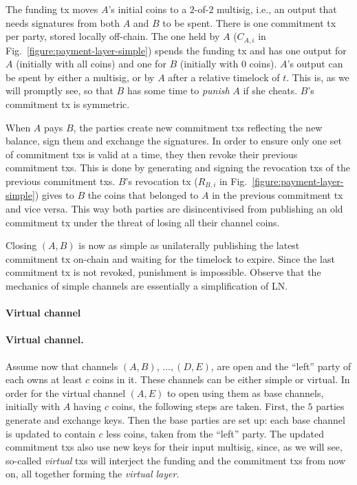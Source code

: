   The funding tx moves $A$'s initial coins to a $2$-of-$2$ multisig, i.e., an
  output that needs signatures from both $A$ and $B$ to be spent. There is one
  commitment tx per party, stored locally off-chain. The one held by $A$
  ($C_{A,i}$ in Fig.~\ref{figure:payment-layer-simple}) spends the funding tx
  and has one output for $A$ (initially with all coins) and one for $B$
  (initially with $0$ coins). $A$'s output can be spent by either a multisig, or
  by $A$ after a relative timelock of $t$. This is, as we will promptly see, so
  that $B$ has some time to \emph{punish} $A$ if she cheats. $B$'s commitment tx
  is symmetric.

  When $A$ pays $B$, the parties create new commitment txs reflecting the new
  balance, sign them and exchange the signatures. In order to ensure only one
  set of commitment txs is valid at a time, they then revoke their previous
  commitment txs. This is done by generating and signing the revocation txs of
  the previous commitment txs. $B$'s revocation tx ($R_{B,i}$ in
  Fig.~\ref{figure:payment-layer-simple}) gives to $B$ the coins that belonged
  to $A$ in the previous commitment tx and vice versa. This way both parties are
  disincentivised from publishing an old commitment tx under the threat of
  losing all their channel coins.

  Closing $(A, B)$ is now as simple as unilaterally publishing the latest
  commitment tx on-chain and waiting for the timelock to expire. Since the last
  commitment tx is not revoked, punishment is impossible. Observe that the
  mechanics of simple channels are essentially a simplification of LN.

  \makeatletter%
    {\paragraph{Virtual channel}}%
    {\paragraph{Virtual channel.}}%
  \makeatother%
  Assume now that channels $(A, B)$, $\dots,(D, E)$, are open and the ``left''
  party of each owns at least $c$ coins in it. These channels can be either
  simple or virtual. In order for the virtual channel $(A, E)$ to open using
  them as base channels, initially with $A$ having $c$ coins, the following
  steps are taken. First, the $5$ parties generate and exchange keys. Then the
  base parties are set up: each base channel is updated to contain $c$ less
  coins, taken from the ``left'' party. The updated commitment txs also use new
  keys for their input multisig, since, as we will see, so-called \emph{virtual}
  txs will interject the funding and the commitment txs from now on, all
  together forming the \emph{virtual layer}.

